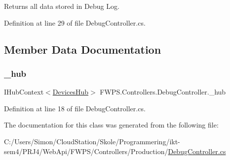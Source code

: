 Returns all data stored in Debug Log. 



Definition at line 29 of file Debug\+Controller.\+cs.



\subsection{Member Data Documentation}
\mbox{\label{class_f_w_p_s_1_1_controllers_1_1_debug_controller_afba643967a93142414405a1eeb093877}} 
\subsubsection{\texorpdfstring{\+\_\+hub}{\_hub}}
{\footnotesize\ttfamily I\+Hub\+Context$<$\mbox{\hyperlink{class_f_w_p_s_1_1_devices_hub}{Devices\+Hub}}$>$ F\+W\+P\+S.\+Controllers.\+Debug\+Controller.\+\_\+hub\hspace{0.3cm}{\ttfamily [private]}}



Definition at line 18 of file Debug\+Controller.\+cs.



The documentation for this class was generated from the following file\+:\begin{DoxyCompactItemize}
\item 
C\+:/\+Users/\+Simon/\+Cloud\+Station/\+Skole/\+Programmering/ikt-\/sem4/\+P\+R\+J4/\+Web\+Api/\+F\+W\+P\+S/\+Controllers/\+Production/\mbox{\hyperlink{_debug_controller_8cs}{Debug\+Controller.\+cs}}\end{DoxyCompactItemize}
